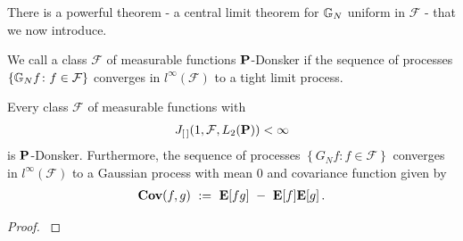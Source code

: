 There is a powerful theorem - a central limit theorem for $\G_N$ uniform in $\mathcal{F}$ - that we now introduce.
\begin{definition}
  We call a class 
  $\mathcal{F}$ of measurable functions 
$\P$-Donsker
if the sequence of processes 
$\left\{ \G_N f \colon f\in\mathcal{F}\right\}$
converges in
$l^\infty(\mathcal{F})$
to a tight limit process.
\end{definition}

\begin{theorem}
  Every class $\mathcal{F}$ of measurable functions 
  with
  \begin{gather*}
    J
    _{[\,]}
    (
    1
    ,
    \mathcal{F}
    ,
    L_2(\P)
    )
    <\infty
  \end{gather*}
  is
  $\P$-Donsker.
  Furthermore,
  the sequence of processes 
$\left\{ G_N f \colon f\in\mathcal{F}\right\}$
  converges 
  in
$l^\infty(\mathcal{F})$
to a Gaussian process with mean 0 and covariance function given by
\begin{gather*}
  \mathbf{Cov}(f,g)
  \ 
  :=
  \ 
  \E[fg]
  \ 
  -
  \ 
  \E[f]\E[g]
  \,.
\end{gather*}
\end{theorem}
\begin{proof}
  \cite[Theorem~19.5]{Vaart2000}
\end{proof}


